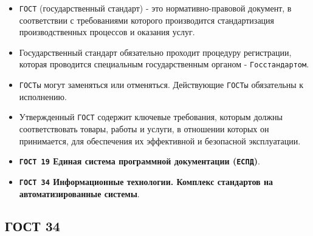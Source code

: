 \documentclass[a4paper, 14pt]{article}
\begin{document}
\begin{itemize}
    \item \texttt{ГОСТ} (государственный стандарт) - это нормативно-правовой документ, в соответствии с требованиями которого производится стандартизация производственных процессов и оказания услуг.
    \item Государственный стандарт обязательно проходит процедуру регистрации, которая проводится специальным государственным органом - \texttt{Госстандартом}.
    \item \texttt{ГОСТы} могут заменяться или отменяться. Действующие \texttt{ГОСТы} обязательны к исполнению.
    \item Утвержденный \texttt{ГОСТ} содержит ключевые требования, которым должны соответствовать товары, работы и услуги, в отношении которых он принимается, для обеспечения их эффективной и безопасной эксплуатации.
    \item \textbf{\texttt{ГОСТ 19} Единая система программной документации (\texttt{ЕСПД})}.
    \item \textbf{\texttt{ГОСТ 34} Информационные технологии. Комплекс стандартов на автоматизированные системы}.
\end{itemize}

\subsection{ГОСТ 34}
\end{document}
